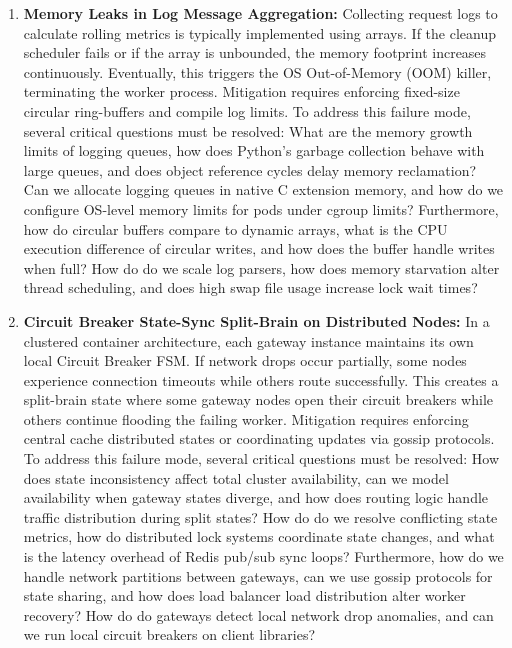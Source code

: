 \documentclass[11pt,a4paper]{article}
\theoremstyle{plain}
\theoremstyle{definition}
\theoremstyle{remark}
\begin{document}
\begin{enumerate}[label=\textbf{MF\arabic*.}]
    \item \textbf{Memory Leaks in Log Message Aggregation:} 
    Collecting request logs to calculate rolling metrics is typically implemented using arrays. If the cleanup scheduler fails or if the array is unbounded, the memory footprint increases continuously. Eventually, this triggers the OS Out-of-Memory (OOM) killer, terminating the worker process.
    Mitigation requires enforcing fixed-size circular ring-buffers and compile log limits.
    To address this failure mode, several critical questions must be resolved: What are the memory growth limits of logging queues, how does Python's garbage collection behave with large queues, and does object reference cycles delay memory reclamation? Can we allocate logging queues in native C extension memory, and how do we configure OS-level memory limits for pods under cgroup limits? Furthermore, how do circular buffers compare to dynamic arrays, what is the CPU execution difference of circular writes, and how does the buffer handle writes when full? How do do we scale log parsers, how does memory starvation alter thread scheduling, and does high swap file usage increase lock wait times?

    \item \textbf{Circuit Breaker State-Sync Split-Brain on Distributed Nodes:} 
    In a clustered container architecture, each gateway instance maintains its own local Circuit Breaker FSM. If network drops occur partially, some nodes experience connection timeouts while others route successfully. This creates a split-brain state where some gateway nodes open their circuit breakers while others continue flooding the failing worker.
    Mitigation requires enforcing central cache distributed states or coordinating updates via gossip protocols.
    To address this failure mode, several critical questions must be resolved: How does state inconsistency affect total cluster availability, can we model availability when gateway states diverge, and how does routing logic handle traffic distribution during split states? How do do we resolve conflicting state metrics, how do distributed lock systems coordinate state changes, and what is the latency overhead of Redis pub/sub sync loops? Furthermore, how do we handle network partitions between gateways, can we use gossip protocols for state sharing, and how does load balancer load distribution alter worker recovery? How do do gateways detect local network drop anomalies, and can we run local circuit breakers on client libraries?


\end{enumerate}
\end{document}
